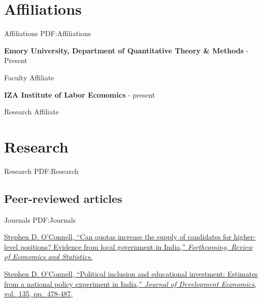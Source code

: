 \documentclass[letterpaper,10pt,oneside]{article}
\begin{document}
\begin{body}
\section
{Affiliations}
{Affiliations}
{PDF:Affiliations}

\SmallEntryGap
\textbf{Emory University, Department of Quantitative Theory \& Methods}
\hfill
{} - Present

Faculty Affiliate

\BigEntryGap

\SmallEntryGap
\textbf{IZA Institute of Labor Economics}
\hfill
{} - present

Research Affiliate

%


\section
{Research}
{Research}
{PDF:Research}


\subsection
{Peer-reviewed articles}
{Journals}
{PDF:Journals}

\EntryGapNoBreak
\href{https://www.mitpressjournals.org/doi/pdf/10.1162/rest_a_00802}
{Stephen D. O'Connell, ``Can quotas increase the supply of candidates for higher-level positions? Evidence from local government in India,'' \textit{Forthcoming, Review of Economics and Statistics.}}

\EntryGapNoBreak
\href{https://doi.org/10.1016/j.jdeveco.2018.08.004}
{Stephen D. O'Connell, ``Political inclusion and educational investment: Estimates from a national policy experiment in India,''
\textit{Journal of Development Economics}, vol.~135, pp.~478-487,  }





\end{body}
\end{document}
